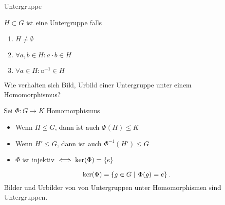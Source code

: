 \documentclass[class=article, crop=false]{standalone}
\begin{document}
\begin{zettel}{Untergruppe}
\begin{flashcard}
    \begin{definition}[Untergruppe]
        $H \subset G$ ist eine Untergruppe falls
    \begin{enumerate}
        \item $H \neq \emptyset$ 
        \item $\forall a,b \in  H \colon a \cdot b \in  H$ 
        \item $\forall a \in  H \colon a^{-1} \in  H$ 
    \end{enumerate}
\end{definition}
\end{flashcard}


\begin{flashcard}
\begin{question}
    Wie verhalten sich Bild, Urbild einer Untergruppe unter einem Homomorphismus?
\end{question}
    \begin{theorem}
    Sei $\Phi: G \longrightarrow K$ Homomorphismus
    \begin{itemize}
        \item Wenn $H \leq  G$, dann ist auch $\Phi(H) \leq K$ 
        \item Wenn $H' \leq  G$, dann ist auch $\Phi^{-1} (H') \leq G$ 
        \item $\Phi$ ist injektiv $\iff \ker (\Phi) = \set{e}$ 
    \end{itemize}
\[
    \ker (\Phi) = \set{g \in  G}{\Phi(g) = e}
.\]
    Bilder und Urbilder von von Untergruppen unter Homomorphismen sind Untergruppen.
    
\end{theorem}
\end{flashcard}
\end{zettel}
\end{document}
